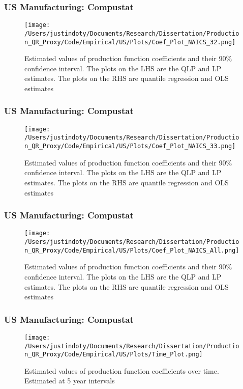 \documentclass{beamer}
\begin{document}
\begin{frame}
\frametitle{US Manufacturing: Compustat}
\begin{figure}[ht]
\centering
\texttt{[image: /Users/justindoty/Documents/Research/Dissertation/Production\_QR\_Proxy/Code/Empirical/US/Plots/Coef\_Plot\_NAICS\_32.png]}
\caption{Estimated values of production function coefficients and their 90\% confidence interval. The plots on the LHS are the QLP and LP estimates. The plots on the RHS are quantile regression and OLS estimates}
\end{figure}
\end{frame}

\begin{frame}
\frametitle{US Manufacturing: Compustat}
\begin{figure}[ht]
\centering
\texttt{[image: /Users/justindoty/Documents/Research/Dissertation/Production\_QR\_Proxy/Code/Empirical/US/Plots/Coef\_Plot\_NAICS\_33.png]}
\caption{Estimated values of production function coefficients and their 90\% confidence interval. The plots on the LHS are the QLP and LP estimates. The plots on the RHS are quantile regression and OLS estimates}
\end{figure}
\end{frame}

\begin{frame}
\frametitle{US Manufacturing: Compustat}
\begin{figure}[ht]
\centering
\texttt{[image: /Users/justindoty/Documents/Research/Dissertation/Production\_QR\_Proxy/Code/Empirical/US/Plots/Coef\_Plot\_NAICS\_All.png]}
\caption{Estimated values of production function coefficients and their 90\% confidence interval. The plots on the LHS are the QLP and LP estimates. The plots on the RHS are quantile regression and OLS estimates}
\end{figure}
\end{frame}

\begin{frame}
\frametitle{US Manufacturing: Compustat}
\begin{figure}[ht]
\centering
\texttt{[image: /Users/justindoty/Documents/Research/Dissertation/Production\_QR\_Proxy/Code/Empirical/US/Plots/Time\_Plot.png]}
\caption{Estimated values of production function coefficients over time. Estimated at 5 year intervals}
\end{figure}
\end{frame}
\end{document}

